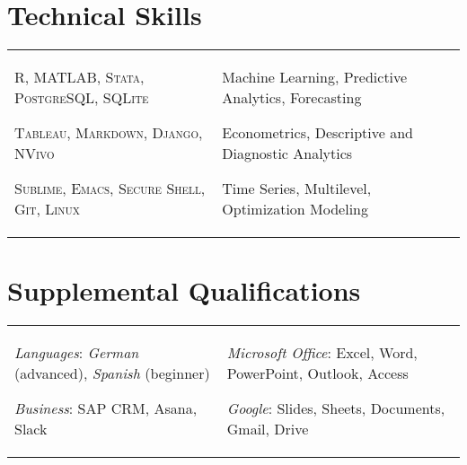 \documentclass[a4paper,10pt]{article}
\begin{document}
\section{Technical Skills}
\begin{supertabular}{p{8.65cm} p{8.65cm}}

	\begin{enumerate*}[label =$\circ$, itemjoin={\newline}]
																\item \small \textsc{R, MATLAB, Stata, PostgreSQL, SQLite}
																\item \small \textsc{Tableau, Markdown, Django, NVivo}
																\item \small \textsc{Sublime, Emacs, Secure Shell, Git, Linux}
																\end{enumerate*}


	& \begin{enumerate*}[label =$\circ$, itemjoin={\newline}]
                                \item \small Machine Learning, Predictive Analytics, Forecasting
                                \item \small Econometrics, Descriptive and Diagnostic Analytics
                                \item \small Time Series, Multilevel, Optimization Modeling \end{enumerate*}  \vspace{2mm} \\



\end{supertabular}



\smallskip
\section{Supplemental Qualifications}
\begin{supertabular}{p{8.65cm} p{8.65cm}}
	\begin{enumerate*}[label =$\circ$, itemjoin={\newline}]
		\item \small \emph{Languages}: \emph{German} (advanced), \emph{Spanish} (beginner)
	 	\item \small \emph{Business}: SAP CRM, Asana, Slack
	\end{enumerate*}

	& \begin{enumerate*}[label =$\circ$, itemjoin={\newline}]
	 	\item \small \emph{Microsoft Office}: Excel, Word, PowerPoint, Outlook, Access
	 	\item \small \emph{Google}: Slides, Sheets, Documents, Gmail, Drive
	\end{enumerate*} \\

\end{supertabular}
\end{document}
